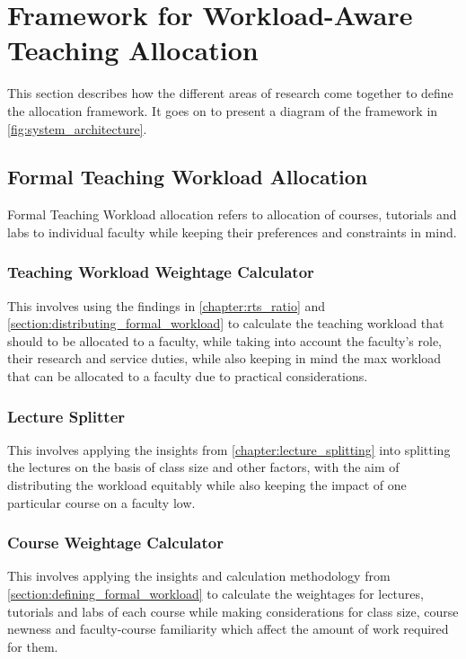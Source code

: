 \chapter{Framework for Workload-Aware Teaching Allocation}


This section describes how the different areas of research come together to define the allocation framework. It goes on to present a diagram of the framework in \autoref{fig:system_architecture}.

\section{Formal Teaching Workload Allocation}

Formal Teaching Workload allocation refers to allocation of courses, tutorials and labs to individual faculty while keeping their preferences and constraints in mind.

\subsection{Teaching Workload Weightage Calculator}

This involves using the findings in \autoref{chapter:rts_ratio} and \autoref{section:distributing_formal_workload} to calculate the teaching workload that should to be allocated to a faculty, while taking into account the faculty's role, their research and service duties, while also keeping in mind the max workload that can be allocated to a faculty due to practical considerations.

\subsection{Lecture Splitter}

This involves applying the insights from \autoref{chapter:lecture_splitting} into splitting the lectures on the basis of class size and other factors, with the aim of distributing the workload equitably while also keeping the impact of one particular course on a faculty low.

\subsection{Course Weightage Calculator}

This involves applying the insights and calculation methodology from \autoref{section:defining_formal_workload} to calculate the weightages for lectures, tutorials and labs of each course while making considerations for class size, course newness and faculty-course familiarity which affect the amount of work required for them.

